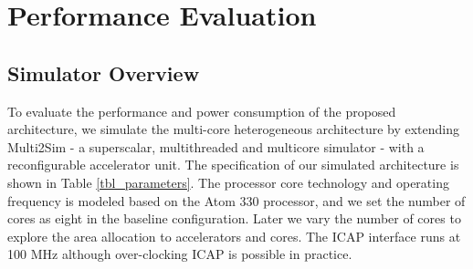 \begin{flushright}

\end{flushright}\section{Performance Evaluation}
\label{sec_perf}
 

\subsection{Simulator Overview}
To evaluate the performance and power consumption of the proposed
architecture, we simulate the multi-core heterogeneous architecture
by extending Multi2Sim - a superscalar, multithreaded and multicore
simulator - with a reconfigurable accelerator unit. 
 The specification of our simulated architecture is shown in Table
\ref{tbl_parameters}. The processor core technology and operating
frequency is modeled based on the Atom 330 processor, and we set the
number of cores as eight in the baseline configuration. Later we vary the
number of cores to explore the area allocation to accelerators and cores. 
The ICAP interface runs at 100 MHz although over-clocking ICAP is
possible in practice\cite{Hansen:2011dt}.

